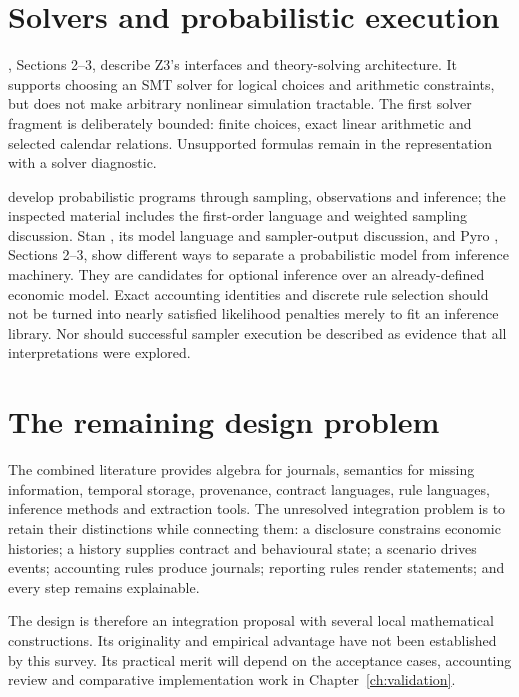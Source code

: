 \section{Solvers and probabilistic execution}

\citet{damoura2008}, Sections 2--3, describe Z3's interfaces and theory-solving
architecture. It supports choosing an SMT solver for logical choices and
arithmetic constraints, but does not make arbitrary nonlinear simulation
tractable. The first solver fragment is deliberately bounded: finite choices,
exact linear arithmetic and selected calendar relations. Unsupported formulas
remain in the representation with a solver diagnostic.

\citet{vandeMeent2018} develop probabilistic programs through sampling,
observations and inference; the inspected material includes the first-order
language and weighted sampling discussion. Stan \citep{carpenter2017}, its
model language and sampler-output discussion, and Pyro \citep{bingham2019},
Sections 2--3, show different ways to separate a probabilistic model from
inference machinery. They are candidates for optional inference over an
already-defined economic model. Exact accounting identities and discrete rule
selection should not be turned into nearly satisfied likelihood penalties
merely to fit an inference library. Nor should successful sampler execution
be described as evidence that all interpretations were explored.

\clearpage
\section{The remaining design problem}

The combined literature provides algebra for journals, semantics for missing
information, temporal storage, provenance, contract languages, rule languages,
inference methods and extraction tools. The unresolved integration problem is
to retain their distinctions while connecting them: a disclosure constrains
economic histories; a history supplies contract and behavioural state; a
scenario drives events; accounting rules produce journals; reporting rules
render statements; and every step remains explainable.

The design is therefore an integration proposal with several local
mathematical constructions. Its originality and empirical advantage have not
been established by this survey. Its practical merit will depend on the
acceptance cases, accounting review and comparative implementation work in
Chapter~\ref{ch:validation}.
